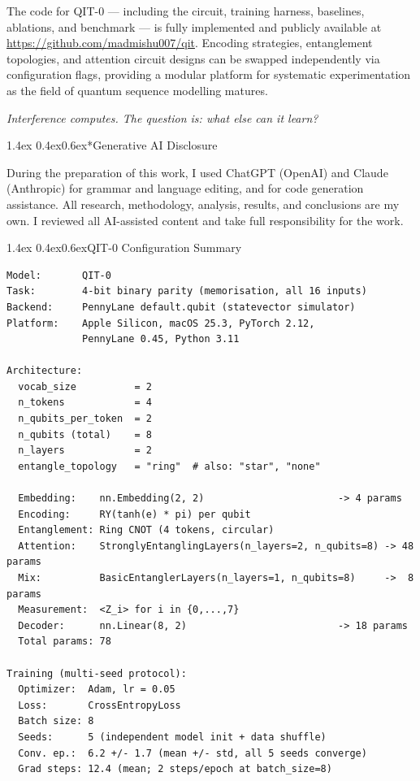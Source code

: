 \documentclass[11pt,a4paper]{article}
\makeatletter
\renewcommand\section{\@startsection{section}{1}{\z@}%
  {1.4ex \@plus 0.4ex}{0.6ex}{\normalfont\large\bfseries}}
\makeatother
\begin{document}
The code for QIT-0 --- including the circuit, training harness, baselines, ablations,
and benchmark --- is fully implemented and publicly available at
\url{https://github.com/madmishu007/qit}. Encoding strategies, entanglement topologies,
and attention circuit designs can be swapped independently via configuration flags,
providing a modular platform for systematic experimentation as the field of quantum
sequence modelling matures.

\bigskip
\noindent\textit{Interference computes. The question is: what else can it learn?}




\section*{Generative AI Disclosure}

During the preparation of this work, I used ChatGPT (OpenAI) and Claude (Anthropic) for grammar and language editing, and for code generation assistance. All research, methodology, analysis, results, and conclusions are my own. I reviewed all AI-assisted content and take full responsibility for the work.

\appendix

\section{QIT-0 Configuration Summary}
\label{app:config}

\begin{lstlisting}
Model:       QIT-0
Task:        4-bit binary parity (memorisation, all 16 inputs)
Backend:     PennyLane default.qubit (statevector simulator)
Platform:    Apple Silicon, macOS 25.3, PyTorch 2.12,
             PennyLane 0.45, Python 3.11

Architecture:
  vocab_size          = 2
  n_tokens            = 4
  n_qubits_per_token  = 2
  n_qubits (total)    = 8
  n_layers            = 2
  entangle_topology   = "ring"  # also: "star", "none"

  Embedding:    nn.Embedding(2, 2)                       -> 4 params
  Encoding:     RY(tanh(e) * pi) per qubit
  Entanglement: Ring CNOT (4 tokens, circular)
  Attention:    StronglyEntanglingLayers(n_layers=2, n_qubits=8) -> 48 params
  Mix:          BasicEntanglerLayers(n_layers=1, n_qubits=8)     ->  8 params
  Measurement:  <Z_i> for i in {0,...,7}
  Decoder:      nn.Linear(8, 2)                          -> 18 params
  Total params: 78

Training (multi-seed protocol):
  Optimizer:  Adam, lr = 0.05
  Loss:       CrossEntropyLoss
  Batch size: 8
  Seeds:      5 (independent model init + data shuffle)
  Conv. ep.:  6.2 +/- 1.7 (mean +/- std, all 5 seeds converge)
  Grad steps: 12.4 (mean; 2 steps/epoch at batch_size=8)
\end{lstlisting}
\end{document}
